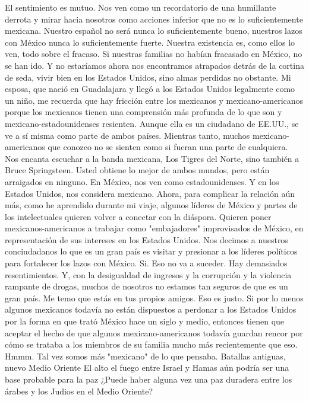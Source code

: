 El sentimiento es mutuo.
Nos ven como un recordatorio de una humillante derrota y mirar hacia nosotros como acciones inferior que no es lo suficientemente mexicana.
Nuestro español no será nunca lo suficientemente bueno, nuestros lazos con México nunca lo suficientemente fuerte.
Nuestra existencia es, como ellos lo ven, todo sobre el fracaso.
Si nuestras familias no habían fracasado en México, no se han ido.
Y no estaríamos ahora nos encontramos atrapados detrás de la cortina de seda, vivir bien en los Estados Unidos, sino almas perdidas no obstante.
Mi esposa, que nació en Guadalajara y llegó a los Estados Unidos legalmente como un niño, me recuerda que hay fricción entre los mexicanos y mexicano-americanos porque los mexicanos tienen una comprensión más profunda de lo que son y mexicano-estadounidenses resienten.
Aunque ella es un ciudadano de EE.UU., se ve a sí misma como parte de ambos países.
Mientras tanto, muchos mexicano-americanos que conozco no se sienten como si fueran una parte de cualquiera.
Nos encanta escuchar a la banda mexicana, Los Tigres del Norte, sino también a Bruce Springsteen.
Usted obtiene lo mejor de ambos mundos, pero están arraigados en ninguno.
En México, nos ven como estadounidenses.
Y en los Estados Unidos, nos considera mexicano.
Ahora, para complicar la relación aún más, como he aprendido durante mi viaje, algunos líderes de México y partes de los intelectuales quieren volver a conectar con la diáspora.
Quieren poner mexicanos-americanos a trabajar como "embajadores" improvisados ​​de México, en representación de sus intereses en los Estados Unidos.
Nos decimos a nuestros conciudadanos lo que es un gran país es visitar y presionar a los líderes políticos para fortalecer los lazos con México.
Si.
Eso no va a suceder.
Hay demasiados resentimientos.
Y, con la desigualdad de ingresos y la corrupción y la violencia rampante de drogas, muchos de nosotros no estamos tan seguros de que es un gran país.
Me temo que estás en tus propios amigos.
Eso es justo.
Si por lo menos algunos mexicanos todavía no están dispuestos a perdonar a los Estados Unidos por la forma en que trató México hace un siglo y medio, entonces tienen que aceptar el hecho de que algunos mexicano-americanos todavía guardan rencor por cómo se trataba a los miembros de su familia mucho más recientemente que eso.
Hmmm.
Tal vez somos más "mexicano" de lo que pensaba.
Batallas antiguas, nuevo Medio Oriente
El alto el fuego entre Israel y Hamas aún podría ser una base probable para la paz
¿Puede haber alguna vez una paz duradera entre los árabes y los Judios en el Medio Oriente?
